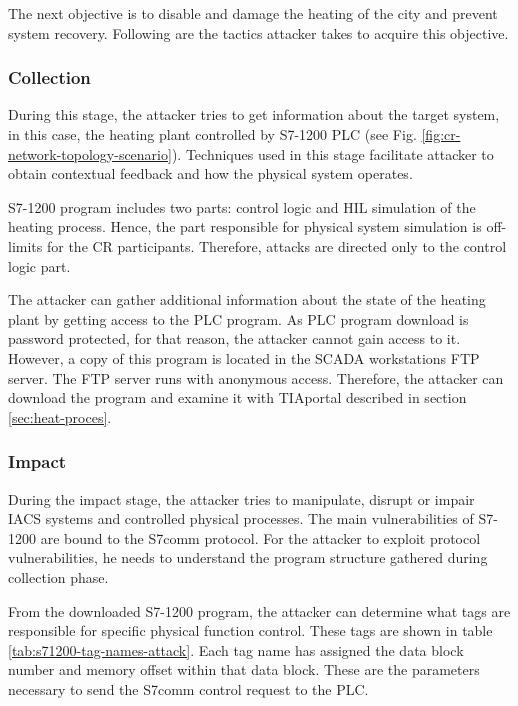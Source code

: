 The next objective is to disable and damage the heating of the city and prevent system recovery. Following are the tactics attacker takes to acquire this objective.

\subsubsection{Collection}

During this stage, the attacker tries to get information about the target system, in this case, the heating plant controlled by S7-1200 PLC (see Fig. \ref{fig:cr-network-topology-scenario}). Techniques used in this stage facilitate attacker to obtain contextual feedback and how the physical system operates.

S7-1200 program includes two parts: control logic and HIL simulation of the heating process. Hence, the part responsible for physical system simulation is off-limits for the CR participants. Therefore, attacks are directed only to the control logic part.

The attacker can gather additional information about the state of the heating plant by getting access to the PLC program. As PLC program download is password protected, for that reason, the attacker cannot gain access to it. However, a copy of this program is located in the SCADA workstations FTP server. The FTP server runs with anonymous access. Therefore, the attacker can download the program and examine it with TIAportal described in section \ref{sec:heat-proces}.

\subsubsection{Impact}

During the impact stage, the attacker tries to manipulate, disrupt or impair IACS systems and controlled physical processes. The main vulnerabilities of S7-1200 are bound to the S7comm protocol. For the attacker to exploit protocol vulnerabilities, he needs to understand the program structure gathered during collection phase. 

From the downloaded S7-1200 program, the attacker can determine what tags are responsible for specific physical function control. These tags are shown in table \ref{tab:s71200-tag-names-attack}. Each tag name has assigned the data block number and memory offset within that data block. These are the parameters necessary to send the S7comm control request to the PLC.

